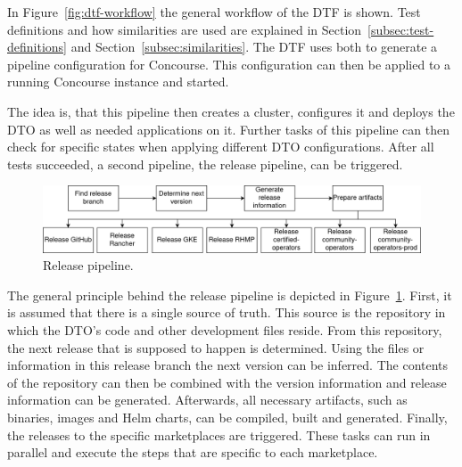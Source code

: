 In Figure~\ref{fig:dtf-workflow} the general workflow of the DTF is shown.
Test definitions and how similarities are used are explained in Section~\ref{subsec:test-definitions} and Section~\ref{subsec:similarities}.
The DTF uses both to generate a pipeline configuration for Concourse.
This configuration can then be applied to a running Concourse instance and started.

The idea is, that this pipeline then creates a cluster, configures it and deploys the DTO as well as needed applications on it.
Further tasks of this pipeline can then check for specific states when applying different DTO configurations.
After all tests succeeded, a second pipeline, the release pipeline, can be triggered.

\begin{figure}[H]
    \centering
    \includegraphics[width=\textwidth]{img/context/release pipeline}
    \caption{Release pipeline.}
    \label{fig:release-pipeline}
\end{figure}

\pagebreak

The general principle behind the release pipeline is depicted in Figure~\ref{fig:release-pipeline}.
First, it is assumed that there is a single source of truth.
This source is the repository in which the DTO's code and other development files reside.
From this repository, the next release that is supposed to happen is determined.
Using the files or information in this release branch the next version can be inferred.
The contents of the repository can then be combined with the version information and release information can be generated.
Afterwards, all necessary artifacts, such as binaries, images and Helm charts, can be compiled, built and generated.
Finally, the releases to the specific marketplaces are triggered.
These tasks can run in parallel and execute the steps that are specific to each marketplace.
